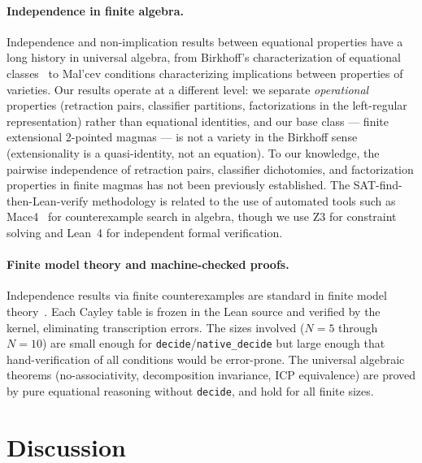 \documentclass[a4paper,UKenglish,cleveref,autoref,thm-restate]{lipics-v2021}
\begin{document}
\paragraph{Independence in finite algebra.}
Independence and non-implication results between equational properties have a long history in universal algebra, from Birkhoff's characterization of equational classes~\cite{burris81} to Mal'cev conditions characterizing implications between properties of varieties. Our results operate at a different level: we separate \emph{operational} properties (retraction pairs, classifier partitions, factorizations in the left-regular representation) rather than equational identities, and our base class --- finite extensional 2-pointed magmas --- is not a variety in the Birkhoff sense (extensionality is a quasi-identity, not an equation). To our knowledge, the pairwise independence of retraction pairs, classifier dichotomies, and factorization properties in finite magmas has not been previously established. The SAT-find-then-Lean-verify methodology is related to the use of automated tools such as Mace4~\cite{mccune10} for counterexample search in algebra, though we use Z3 for constraint solving and Lean~4 for independent formal verification.

\paragraph{Finite model theory and machine-checked proofs.}
Independence results via finite counterexamples are standard in finite model theory~\cite{libkin04}. Each Cayley table is frozen in the Lean source and verified by the kernel, eliminating transcription errors. The sizes involved ($N\!=\!5$ through $N\!=\!10$) are small enough for \texttt{decide}/\texttt{native\_decide} but large enough that hand-verification of all conditions would be error-prone. The universal algebraic theorems (no-associativity, decomposition invariance, ICP equivalence) are proved by pure equational reasoning without \texttt{decide}, and hold for all finite sizes.

\section{Discussion}
\label{sec:discussion}
\end{document}
